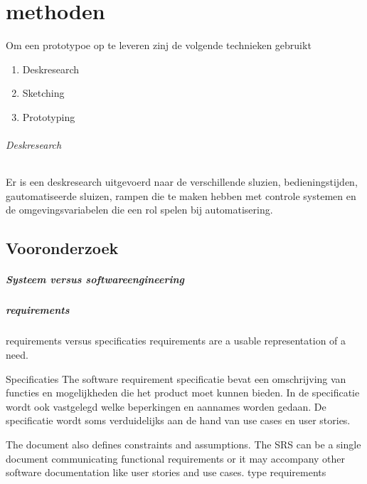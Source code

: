 \chapter{methoden}



Om een prototypoe op te leveren zinj de volgende technieken gebruikt

\begin{enumerate}
	\item Deskresearch
	\item Sketching
	\item Prototyping
\end{enumerate}

\subparagraph{Deskresearch}
Er is een deskresearch uitgevoerd naar de verschillende sluzien, bedieningstijden, gautomatiseerde sluizen, rampen die te maken hebben met controle systemen en de omgevingsvariabelen die een rol spelen bij automatisering.
\label{chapter:body}
\thispagestyle{myheadings}

\graphicspath{{2_Body/Figures/}}

\section{Vooronderzoek}


\paragraph{Systeem versus softwareengineering}


\paragraph{requirements}
requirements versus specificaties 
requirements are a usable representation of a need.

Specificaties
The software requirement specificatie bevat een omschrijving van functies en mogelijkheden die het product moet kunnen bieden. In de specificatie wordt ook vastgelegd welke beperkingen en aannames worden gedaan. De specificatie wordt soms verduidelijks aan de hand van use cases en user stories.




The document also defines constraints and assumptions. The SRS can be a single document communicating functional requirements or it may accompany other software documentation like user stories and use cases.
type requirements 

